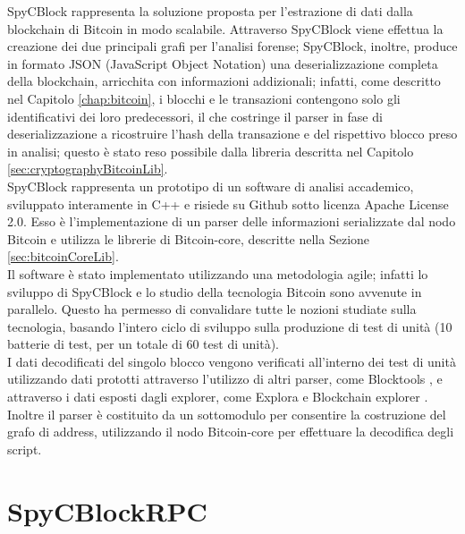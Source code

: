 SpyCBlock rappresenta la soluzione proposta per l'estrazione di dati dalla blockchain di Bitcoin in modo scalabile. Attraverso SpyCBlock viene effettua la creazione dei due principali grafi per l'analisi forense; SpyCBlock, inoltre, produce in formato JSON (JavaScript Object Notation) una deserializzazione completa della blockchain, arricchita con informazioni addizionali; infatti, come descritto nel Capitolo \ref{chap:bitcoin}, i blocchi e le transazioni contengono solo gli identificativi dei loro predecessori, il che costringe il parser in fase di deserializzazione a ricostruire l'hash della transazione e del rispettivo blocco preso in analisi; questo è stato reso possibile dalla libreria  descritta nel Capitolo \ref{sec:cryptographyBitcoinLib}.\\
SpyCBlock rappresenta un prototipo di un software di analisi accademico, sviluppato interamente in C++ e risiede su Github sotto licenza Apache License 2.0. Esso è l'implementazione di un parser delle informazioni serializzate dal nodo Bitcoin e utilizza le librerie di Bitcoin-core, descritte nella Sezione \ref{sec:bitcoinCoreLib}.\\
Il software è stato implementato utilizzando una metodologia agile; infatti lo sviluppo di SpyCBlock e lo studio della tecnologia Bitcoin sono avvenute in parallelo. Questo ha permesso di convalidare tutte le nozioni studiate sulla tecnologia, basando l'intero ciclo di sviluppo sulla produzione di test di unità (10 batterie di test, per un totale di 60 test di unità).\\
I dati decodificati del singolo blocco vengono verificati all'interno dei test di unità utilizzando dati prototti attraverso l'utilizzo di altri parser, come Blocktools \cite{parser:blocktools}, e attraverso i dati esposti dagli explorer, come Explora \cite{blockstream:esplora} e Blockchain explorer \cite{blockchain:explorer}.\\
Inoltre il parser è costituito da un sottomodulo per consentire la costruzione del grafo di address, utilizzando il nodo Bitcoin-core per effettuare la decodifica degli script.

\section{SpyCBlockRPC} \label{sec:spycblockrpc}

